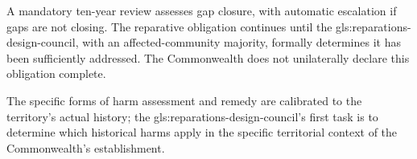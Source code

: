 A mandatory ten-year review assesses gap closure, with automatic escalation if gaps are not closing. The reparative obligation continues until the \gls{gls:reparations-design-council}, with an affected-community majority, formally determines it has been sufficiently addressed. The Commonwealth does not unilaterally declare this obligation complete.

The specific forms of harm assessment and remedy are calibrated to the territory's actual history; the \gls{gls:reparations-design-council}'s first task is to determine which historical harms apply in the specific territorial context of the Commonwealth's establishment.
